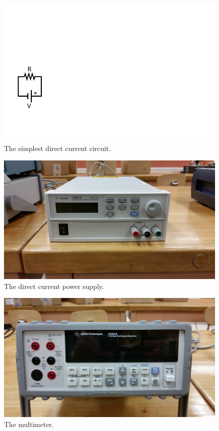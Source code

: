 \documentclass[12pt]{article}
\begin{document}
\begin{figure}
  \centering
  \includegraphics[width=\textwidth/5]{figures/simplest}
  \caption{The simplest direct current circuit.}
  \label{fig:simple}
\end{figure}
\begin{figure}
  \centering
\includegraphics[width=\textwidth/2]{figures/agilent_u8001a}
  \caption{The direct current power supply.}
  \label{fig:dcps}
\end{figure}
\begin{figure}
  \centering
    \includegraphics[width=2\textwidth/3]{figures/agilent_u3401a}
  \caption{The multimeter.}
  \label{fig:multimeter}
\end{figure}
\end{document}
